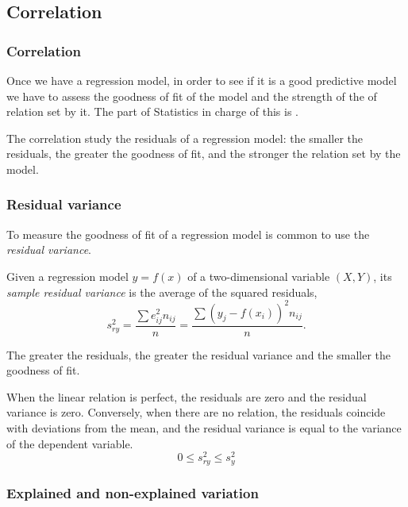 \subsection{Correlation}
\begin{frame}
\frametitle{Correlation}
Once we have a regression model, in order to see if it is a good predictive model we have to assess the goodness of fit of the model and the strength of the of relation set by it. 
The part of Statistics in charge of this is .

The correlation study the residuals of a regression model: the smaller the residuals, the greater the goodness of fit, and the stronger the relation set by the model. 
\end{frame}


\begin{frame}
\frametitle{Residual variance}
To measure the goodness of fit of a regression model is common to use the \emph{residual variance}.
\begin{definition}
Given a regression model $y=f(x)$ of a two-dimensional variable $(X,Y)$, its \emph{sample residual variance} is the average of the squared residuals,
\[
s_{ry}^2 = \frac{\sum e_{ij}^2n_{ij}}{n} = \frac{\sum (y_j - f(x_i))^2n_{ij}}{n}.
\]
\end{definition}

The greater the residuals, the greater the residual variance and the smaller the goodness of fit. 

When the linear relation is perfect, the residuals are zero and the residual variance is zero. 
Conversely, when there are no relation, the residuals coincide with deviations from the mean, and the residual variance is equal to the variance of the dependent variable.
\[
0\leq s_{ry}^2\leq s_y^2
\]
\end{frame}


\begin{frame}
\frametitle{Explained and non-explained variation}
\begin{center}
\end{center}
\end{frame}


